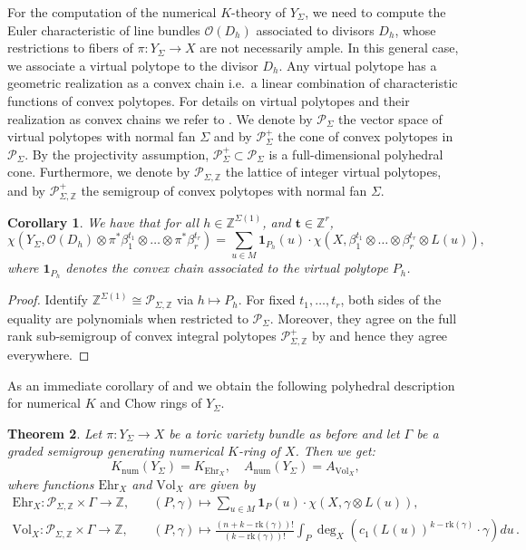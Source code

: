 \documentclass[oneside]{amsart}
\theoremstyle{plain}
\newtheorem{theorem}{Theorem}[section]
\newtheorem{corollary}[theorem]{Corollary}
\theoremstyle{definition}
\newcommand{\Z}{{\mathbb{Z}}}
\newcommand{\Om}{{\mathcal{O}}}
\newcommand{\cP}{{\mathcal{P}}}
\newcommand{\rk}{{\mathrm{rk}}}
\newcommand{\Vol}{{\mathrm{Vol}}}
\newcommand{\Ehr}{{\mathrm{Ehr}}}
\begin{document}
For the computation of the numerical $K$-theory of $Y_\Sigma$, we need to compute the Euler characteristic of line bundles $\Om(D_h)$ associated to divisors $D_h$, whose restrictions to fibers of $\pi:Y_\Sigma\to X$ are not necessarily ample. In this general case, we associate a virtual polytope to the divisor $D_h$. Any virtual polytope has a geometric realization as a convex chain i.e.\ a linear combination of characteristic functions of convex polytopes. For details on virtual polytopes and their realization as convex chains we refer to \cite{PK92}. We denote by $\cP_\Sigma$ the vector space of virtual polytopes with normal fan $\Sigma$ and by $\cP_\Sigma^+$ the cone of convex polytopes in $\cP_\Sigma$. By the projectivity assumption, $\cP_\Sigma^+\subset \cP_\Sigma$ is a full-dimensional polyhedral cone. Furthermore, we denote by $\cP_{\Sigma,\Z}$ the lattice of integer virtual polytopes, and by $\cP_{\Sigma,\Z}^+$ the semigroup of convex polytopes with normal fan $\Sigma$.
\begin{corollary}\label{thm:bundleEuler}
We have that for all $h \in \Z^{\Sigma(1)}$, and $\mathbf{t} \in \Z^r$,
\[
\chi(Y_\Sigma, \Om(D_h)\otimes \pi^*\beta_1^{t_1}\otimes\ldots\otimes \pi^*\beta_r^{t_r})
=\sum_{u\in M} \mathbf{1}_{P_h}(u) \cdot \chi(X,\beta_1^{t_1}\otimes\ldots\otimes\beta_r^{t_r} \otimes L(u)),
\]
where $\mathbf{1}_{P_h}$ denotes the convex chain associated to the virtual polytope $P_h$.
\end{corollary}
 
\begin{proof}
    Identify $\Z^{\Sigma(1)} \cong \cP_{\Sigma, \Z}$ via $h \mapsto P_h$.
    For fixed $t_1,\ldots, t_r$, both sides of the equality are polynomials when restricted to $\cP_\Sigma$. Moreover, they agree on the full rank sub-semigroup of convex integral polytopes $\cP_{\Sigma,\Z}^+$ by  and hence they agree everywhere.
\end{proof}

As an immediate corollary of  and  we obtain the following polyhedral description for numerical $K$ and Chow rings of $Y_\Sigma$.
\begin{theorem}\label{thm:bundle K and Chow}
Let $\pi:Y_\Sigma\to X$ be a toric variety bundle as before and let $\Gamma$ be a graded semigroup generating numerical $K$-ring of $X$. Then we get:
\[
K_{\mathrm{num}}(Y_\Sigma) = K_{\Ehr_X},\quad A_{\mathrm{num}}(Y_\Sigma) = A_{\Vol_X},
\]
where functions $\Ehr_X$ and $\Vol_X$ are given by
\begin{align*}
    \Ehr_X\colon \cP_{\Sigma,\Z}\times \Gamma \to \Z, \quad &(P,\gamma)\mapsto \sum_{u\in M} \mathbf{1}_{P}(u) \cdot \chi(X,\gamma\otimes L(u)),\\
    \Vol_X \colon \cP_{\Sigma,\Z}\times \Gamma \to \Z, \quad &(P,\gamma)\mapsto \frac{(n+k -\rk(\gamma))!}{(k-\rk(\gamma))!}\int_{P} \deg_X(c_1(L(u))^{k-\rk(\gamma)}\cdot \gamma) du\,.
\end{align*}
\end{theorem}
\end{document}
